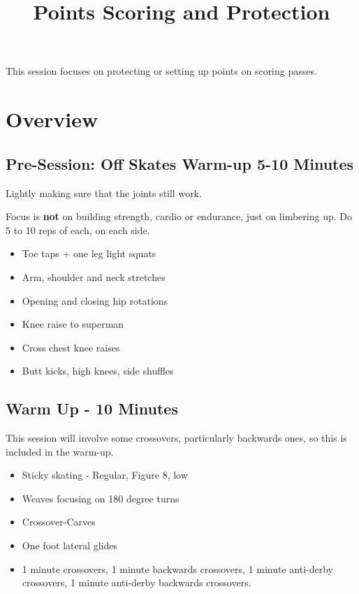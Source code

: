 \documentclass{journal}
\title{Points Scoring and Protection}
\author{}
\begin{document}
\maketitle
\noindent 

This session focuses on protecting or setting up points on scoring passes.

\section*{Overview}

\subsection*{Pre-Session: Off Skates Warm-up 5-10 Minutes}
Lightly making sure that the joints still work.

Focus is {\bf not} on building strength, cardio or endurance, just on limbering up. Do 5 to 10 reps of each, on each side. 

\begin{itemize}
\item Toe taps + one leg light squats
\item Arm, shoulder and neck stretches
\item Opening and closing hip rotations
\item Knee raise to superman 
\item Cross chest knee raises
\item Butt kicks, high knees, side shuffles
\end{itemize}


\subsection*{Warm Up - 10 Minutes}

This session will involve some crossovers, particularly backwards ones, so this is included in the warm-up.

\begin{itemize}
\item Sticky skating - Regular, Figure 8, low
\item Weaves focusing on 180 degree turns 
\item Crossover-Carves
\item One foot lateral glides
\item 1 minute crossovers, 1 minute backwards crossovers, 1 minute anti-derby crossovers, 1 minute anti-derby backwards crossovers.  
\end{itemize}
\end{document}
